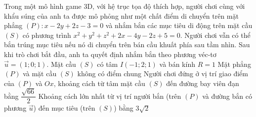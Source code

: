 \begin{ex}%
	Trong một mô hình game 3D, với hệ trục tọa độ thích hợp, người chơi cùng với khẩu súng của anh ta được mô phỏng như một chất điểm di chuyển trên mặt phẳng $(P)\colon x-2y+2z-3=0$ và nhắm bắn các mục tiêu di động trên mặt cầu $(S)$ có phương trình $x^2+y^2+z^2+2x-4y-2z+5=0$. Người chơi vẫn có thể bắn trúng mục tiêu nếu nó di chuyển trên bán cầu khuất phía sau  tầm nhìn. Sau khi trò chơi bắt đầu, anh ta quyết định nhắm bắn theo phương véc-tơ $\overrightarrow{u}=(1;0;1)$.
	\choiceTF 
		{\True Mặt  cầu $(S)$ có tâm $I(-1;2;1)$ và bán kính $R=1$}
		{\True Mặt phẳng $(P)$ và mặt  cầu $(S)$ không có điểm chung}
		{\True Người chơi đứng ở vị trí  giao điểm của $(P)$ và $Ox$, khoảng cách từ tâm mặt cầu $(S)$ đến đường bay viên đạn bằng $\dfrac{\sqrt{66}}{2}$}
		{\True Khoảng cách  lớn nhất từ vị trí người bắn (trên $(P)$ và đường bắn có phương $\overrightarrow{u}$) đến mục tiêu (trên $(S)$) bằng $3\sqrt{2}$}
\end{ex}
